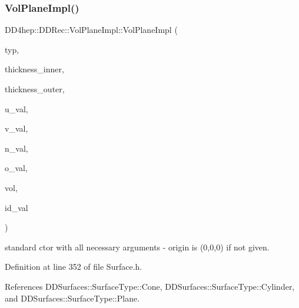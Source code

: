 \hypertarget{class_d_d4hep_1_1_d_d_rec_1_1_vol_plane_impl_adf4bdd2cb9f2f01e7662f6b0a1cb1379}{}\label{class_d_d4hep_1_1_d_d_rec_1_1_vol_plane_impl_adf4bdd2cb9f2f01e7662f6b0a1cb1379} 
\subsubsection{\texorpdfstring{Vol\+Plane\+Impl()}{VolPlaneImpl()}\hspace{0.1cm}{\footnotesize\ttfamily [2/2]}}
{\footnotesize\ttfamily D\+D4hep\+::\+D\+D\+Rec\+::\+Vol\+Plane\+Impl\+::\+Vol\+Plane\+Impl (\begin{DoxyParamCaption}\item[{\hyperlink{class_d_d_surfaces_1_1_surface_type}{Surface\+Type}}]{typ,  }\item[{double}]{thickness\+\_\+inner,  }\item[{double}]{thickness\+\_\+outer,  }\item[{\hyperlink{class_d_d_surfaces_1_1_vector3_d}{Vector3D}}]{u\+\_\+val,  }\item[{\hyperlink{class_d_d_surfaces_1_1_vector3_d}{Vector3D}}]{v\+\_\+val,  }\item[{\hyperlink{class_d_d_surfaces_1_1_vector3_d}{Vector3D}}]{n\+\_\+val,  }\item[{\hyperlink{class_d_d_surfaces_1_1_vector3_d}{Vector3D}}]{o\+\_\+val,  }\item[{\hyperlink{class_d_d4hep_1_1_geometry_1_1_volume}{Geometry\+::\+Volume}}]{vol,  }\item[{int}]{id\+\_\+val }\end{DoxyParamCaption})\hspace{0.3cm}{\ttfamily [inline]}}



standard c\textquotesingle{}tor with all necessary arguments -\/ origin is (0,0,0) if not given. 



Definition at line 352 of file Surface.\+h.



References D\+D\+Surfaces\+::\+Surface\+Type\+::\+Cone, D\+D\+Surfaces\+::\+Surface\+Type\+::\+Cylinder, and D\+D\+Surfaces\+::\+Surface\+Type\+::\+Plane.



